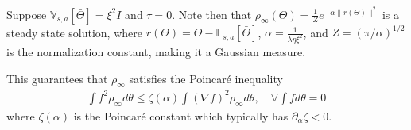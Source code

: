 \documentclass[10.5pt]{article}
\newcommand\bb{\mathbb}
\begin{document}
Suppose $\bb V_{s,a}[\bar \Theta] = \xi^2 I$ and $\tau = 0$.
Note then that $\rho_\infty(\Theta) = \tfrac{1}{Z} e^{-\alpha \|r(\Theta)\|^2}$
is a steady state solution, where $r(\Theta)= \Theta - \bb E_{s,a}[\bar \Theta]$, $\alpha = \frac{1}{\lambda \eta \xi^2}$, and $Z = (\pi/\alpha)^{1/2}$ is the normalization constant, making it a Gaussian measure.

This guarantees that $\rho_\infty$ satisfies the Poincar\'e inequality
\begin{align*}
  \int f^2 \rho_\infty d\theta \leq \zeta (\alpha) \int (\nabla f)^2 \rho_\infty d\theta, \quad \forall \int f d\theta = 0
\end{align*}
where $\zeta (\alpha)$ is the Poincar\'e constant which typically has $\partial_\alpha \zeta< 0 $.
\end{document}
